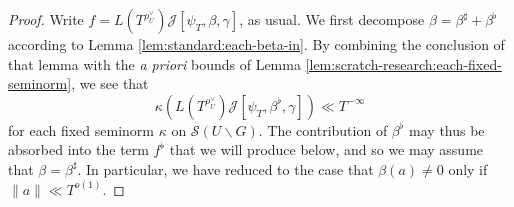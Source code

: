 \documentclass[reqno]{amsart}
\theoremstyle{plain} \newtheorem{theorem} {Theorem}
\theoremstyle{definition} \newtheorem{definition} [theorem] {Definition}
\theoremstyle{itplain} %
\numberwithin{equation}{section}
\numberwithin{theorem}{section}
\begin{document}
\begin{proof}
  Write $f = L(T ^{\rho _U ^\vee }) \mathcal{J}[\psi_T, \beta, \gamma]$, as usual.  We first decompose $\beta = \beta ^\sharp + \beta ^\flat$ according to Lemma \ref{lem:standard:each-beta-in}.  By combining the conclusion of that lemma with the \emph{a priori} bounds of Lemma \ref{lem:scratch-research:each-fixed-seminorm}, we see that
  \begin{equation*}
    \kappa(L(T^{\rho_U^\vee}) \mathcal{J}[\psi_T,\beta^\flat,\gamma]) \ll T^{-\infty}
  \end{equation*}
for each fixed seminorm $\kappa$ on $\mathcal{S}(U \backslash G)$.  The contribution of $\beta^{\flat}$ may thus be absorbed into the term $f^{\flat}$ that we will produce below, and so we may assume that $\beta = \beta^\sharp$.  In particular, we have reduced to the case that $\beta(a) \neq 0$ only if $\|a\| \ll T^{o(1)}$.
 

\end{proof}
\end{document}
